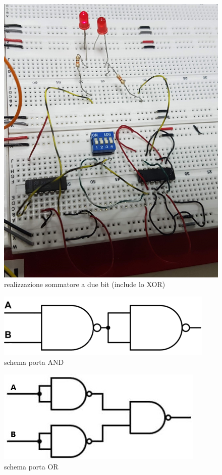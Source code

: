 \documentclass[10pt,a4paper]{article}
\begin{document}
\begin{figure}[h]
			\centering
			\includegraphics[scale=0.05]{20190221_180923.jpg}
			\caption{realizzazione sommatore a due bit (include lo XOR)}
			\label{XOR}
\end{figure}
\begin{figure}
	\centering
	\includegraphics[scale=0.60]{and}
	\caption{schema porta AND}
	\label{fig:and}
\end{figure}
\begin{figure}
	\centering
	\includegraphics[scale=0.85]{or}
	\caption{schema porta OR}
	\label{fig:or}
\end{figure}
\end{document}
